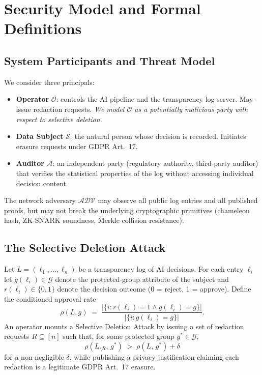 \section{Security Model and Formal Definitions}
\label{sec:model}

\subsection{System Participants and Threat Model}

We consider three principals:
\begin{itemize}
  \item \textbf{Operator} $\mathcal{O}$: controls the AI pipeline and the
  transparency log server. May issue redaction requests. \emph{We model
  $\mathcal{O}$ as a potentially malicious party with respect to selective
  deletion.}
  \item \textbf{Data Subject} $\mathcal{S}$: the natural person whose
  decision is recorded. Initiates erasure requests under GDPR Art.~17.
  \item \textbf{Auditor} $\mathcal{A}$: an independent party (regulatory
  authority, third-party auditor) that verifies the statistical properties
  of the log without accessing individual decision content.
\end{itemize}

\noindent The network adversary $\mathcal{ADV}$ may observe all public log
entries and all published proofs, but may not break the underlying
cryptographic primitives (chameleon hash, ZK-SNARK soundness, Merkle
collision resistance).

\subsection{The Selective Deletion Attack}

\begin{definition}
\label{def:sda}
Let $L = (\ell_1, \ldots, \ell_n)$ be a transparency log of AI decisions.
For each entry $\ell_i$ let $g(\ell_i) \in \mathcal{G}$ denote the
protected-group attribute of the subject and $r(\ell_i) \in \{0,1\}$
denote the decision outcome (0 = reject, 1 = approve). Define the
conditioned approval rate
\[
  \rho(L, g) \;=\; \frac{|\{i : r(\ell_i) = 1 \land g(\ell_i) = g\}|}
                       {|\{i : g(\ell_i) = g\}|}.
\]
An operator mounts a Selective Deletion Attack by issuing a set of
redaction requests $R \subseteq [n]$ such that, for some protected group
$g^* \in \mathcal{G}$,
\[
  \rho(L_{\setminus R},\, g^*) \;>\; \rho(L,\, g^*) + \delta
\]
for a non-negligible $\delta$, while publishing a privacy justification
claiming each redaction is a legitimate GDPR Art.~17 erasure.
\end{definition}

